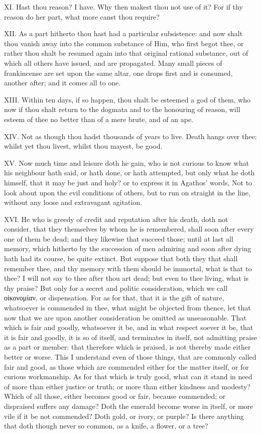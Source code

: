 XI. Hast thou reason? I have. Why then makest thou not use of it? For if
thy reason do her part, what more canst thou require?

XII. As a part hitherto thou hast had a particular subsistence: and now
shalt thou vanish away into the common substance of Him, who first begot
thee, or rather thou shalt be resumed again into that original rational
substance, out of which all others have issued, and are propagated. Many
small pieces of frankincense are set upon the same altar, one drops first
and is consumed, another after; and it comes all to one.

XIII. Within ten days, if so happen, thou shalt be esteemed a god of
them, who now if thou shalt return to the dogmata and to the honouring of
reason, will esteem of thee no better than of a mere brute, and of an ape.

XIV. Not as though thou hadst thousands of years to live. Death hangs
over thee: whilst yet thou livest, whilst thou mayest, be good.

XV. Now much time and leisure doth he gain, who is not curious to know
what his neighbour hath said, or hath done, or hath attempted, but only
what he doth himself, that it may be just and holy? or to express it in
Agathos' words, Not to look about upon the evil conditions of others, but
to run on straight in the line, without any loose and extravagant
agitation.

XVI. He who is greedy of credit
and reputation after his death, doth not consider, that they themselves by whom
he is remembered, shall soon after every one of them be dead; and they likewise
that succeed those; until at last all memory, which hitherto by the succession
of men admiring and soon after dying hath had its course, be quite extinct. But
suppose that both they that shall remember thee, and thy memory with them
should be immortal, what is that to thee? I will not say to thee after thou art
dead; but even to thee living, what is thy praise? But only for a secret and
politic consideration, which we call
οἰκονομίαν, or
dispensation. For as for that, that it is the gift of nature, whatsoever is
commended in thee, what might be objected from thence, let that now that we are
upon another consideration be omitted as unseasonable. That which is fair and
goodly, whatsoever it be, and in what respect soever it be, that it is fair and
goodly, it is so of itself, and terminates in itself, not admitting praise as a
part or member: that therefore which is praised, is not thereby made either
better or worse. This I understand even of those things, that are commonly
called fair and good, as those which are commended either for the matter
itself, or for curious workmanship. As for that which is truly good, what can
it stand in need of more than either justice or truth; or more than either
kindness and modesty? Which of all those, either becomes good or fair, because
commended; or dispraised suffers any damage? Doth the emerald become worse in
itself, or more vile if it be not commended? Doth gold, or ivory, or purple? Is
there anything that doth though never so common, as a knife, a flower, or a
tree?

